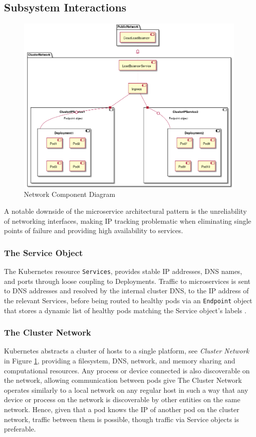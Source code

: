\subsection{Subsystem Interactions}
\label{subsec:subsystem_interactions}
\begin{figure}[H]
    \centering
    \includegraphics[scale=.4]{images/networking-class.png}
    \caption{Network Component Diagram}
    \label{fig:network_components}
\end{figure}
A notable downside of the microservice architectural pattern is the unreliability of networking interfaces, making IP tracking problematic when eliminating single points of failure and providing high availability to services.
\subsubsection{The Service Object}
The Kubernetes resource \texttt{Services}, provides stable IP addresses, DNS names, and ports through loose coupling to Deployments.
Traffic to microservices is sent to DNS addresses and resolved by the internal cluster DNS, to the IP address of the relevant Services, before being routed to healthy pods via an \texttt{Endpoint} object that stores a dynamic list of healthy pods matching the Service object's labels \cite{k8sbook}.

\subsubsection{The Cluster Network}
Kubernetes abstracts a cluster of hosts to a single platform, see \textit{Cluster Network} in Figure \ref{fig:network_components}, providing a filesystem, DNS, network, and memory sharing and computational resources. Any process or device connected is also discoverable on the network, allowing communication between pods give 
The Cluster Network operates similarly to a local network on any regular host in such a way that any device or process on the network is discoverable by other entities on the same network. 
Hence, given that a pod knows the IP of another pod on the cluster network, traffic between them is possible, though traffic via Service objects is preferable.
